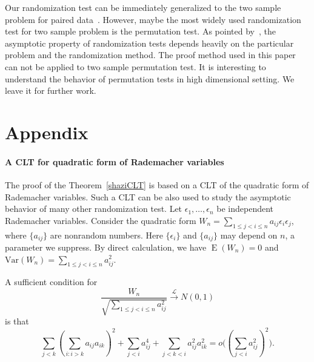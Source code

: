 \documentclass[smallcondensed,final,natbib]{svjour3}          %
\DeclareMathOperator{\myE}{E}
\begin{document}
Our randomization test can be immediately generalized to the two sample problem for paired data~\citep{Konietschke2014}.
However, maybe the most widely used randomization test for two sample problem is the permutation test.
As pointed by~\citet{Romano1990On}, the asymptotic property of randomization tests depends heavily on the particular problem and the randomization method.
The proof method used in this paper can not be applied to two sample permutation test.
 It is interesting to understand the behavior of permutation tests in high dimensional setting. We leave it for further work.


\section*{Appendix}
\paragraph{A CLT for quadratic form of Rademacher variables}
The proof of the Theorem~\ref{shaziCLT} is based on a CLT of the quadratic form of Rademacher variables. 
Such a CLT can be also used to study the asymptotic behavior of many other randomization test.
 Let $\epsilon_1,\ldots,\epsilon_n$ be independent Rademacher  variables. 
 Consider the quadratic form $W_n=\sum_{1\leq j<i\leq n} a_{ij}\epsilon_i \epsilon_j$, where $\{a_{ij}\}$ are nonrandom numbers. Here $\{\epsilon_i\}$ and $\{a_{ij}\}$ may depend on $n$, a parameter we suppress.
 By direct calculation, we have $\myE(W_n)=0$ and $\mathrm{Var}(W_n)=\sum_{1\leq j<i\leq n} a_{ij}^2$.

 \begin{proposition}\label{CLTprop}
     A sufficient condition for
     \begin{equation*}
         \frac{W_n}{\sqrt{\sum_{1\leq j<i\leq n} a_{ij}^2}}\xrightarrow{\mathcal{L}} N(0,1)
     \end{equation*}
     is that
     \begin{equation*}
         \sum_{j<k}{(\sum_{i:i>k}a_{ij}a_{ik})}^2+
         \sum_{j<i}a_{ij}^4+
         \sum_{j<k<i}a_{ij}^2 a_{ik}^2
         =o\big({(\sum_{j<i} a_{ij}^2)}^2\big).
     \end{equation*}
 \end{proposition}
\end{document}
